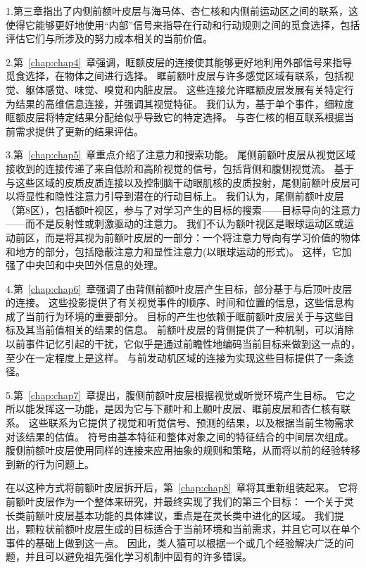 \par 
1.第三章指出了内侧前额叶皮层与海马体、杏仁核和内侧前运动区之间的联系，这使得它能够更好地使用“内部”信号来指导在行动和行动规则之间的觅食选择，包括评估它们与所涉及的努力成本相关的当前价值。
\par 
2.第~\ref{chap:chap4}~章强调，眶额皮层的连接使其能够更好地利用外部信号来指导觅食选择，在物体之间进行选择。
眶前额叶皮层与许多感觉区域有联系，包括视觉、躯体感觉、味觉、嗅觉和内脏皮层。
这些连接允许眶额皮层发展有关特定行为结果的高维信息连接，并强调其视觉特征。
我们认为，基于单个事件，细粒度眶额皮层将特定结果分配给似乎导致它的特定选择。
与杏仁核的相互联系根据当前需求提供了更新的结果评估。
\par 
3.第~\ref{chap:chap5}~章重点介绍了注意力和搜索功能。
尾侧前额叶皮层从视觉区域接收到的连接传递了来自低阶和高阶视觉的信号，包括背侧和腹侧视觉流。
基于与这些区域的皮质皮质连接以及控制脑干动眼肌核的皮质投射，尾侧前额叶皮层可以将显性和隐性注意力引导到潜在的行动目标上。
我们认为，尾侧前额叶皮层（第8区），包括额叶视区，参与了对学习产生的目标的搜索——目标导向的注意力——而不是反射性或刺激驱动的注意力。
我们不认为额叶视区是眼球运动区或运动前区，而是将其视为前额叶皮层的一部分：一个将注意力导向有学习价值的物体和地方的部分，包括隐蔽注意力和显性注意力(以眼球运动的形式)。
这样，它加强了中央凹和中央凹外信息的处理。
\par 
4.第~\ref{chap:chap6}~章强调了由背侧前额叶皮层产生目标，部分基于与后顶叶皮层的连接。
这些投影提供了有关视觉事件的顺序、时间和位置的信息，这些信息构成了当前行为环境的重要部分。
目标的产生也依赖于眶前额叶皮层关于与这些目标及其当前值相关的结果的信息。
前额叶皮层的背侧提供了一种机制，可以消除以前事件记忆引起的干扰，它似乎是通过前瞻性地编码当前目标来做到这一点的，至少在一定程度上是这样。
与前发动机区域的连接为实现这些目标提供了一条途径。
\par 
5.第~\ref{chap:chap7}~章提出，腹侧前额叶皮层根据视觉或听觉环境产生目标。
它之所以能发挥这一功能，是因为它与下颞叶和上颞叶皮层、眶前皮层和杏仁核有联系。
这些联系为它提供了视觉和听觉信号、预测的结果，以及根据当前生物需求对该结果的估值。
符号由基本特征和整体对象之间的特征结合的中间层次组成。
腹侧前额叶皮层使用同样的连接来应用抽象的规则和策略，从而将以前的经验转移到新的行为问题上。
\par 
在以这种方式将前额叶皮层拆开后，第~\ref{chap:chap8}~章将其重新组装起来。
它将前额叶皮层作为一个整体来研究，并最终实现了我们的第三个目标：
一个关于灵长类前额叶皮层基本功能的具体建议，重点是在灵长类中进化的区域。
我们提出，颗粒状前额叶皮层生成的目标适合于当前环境和当前需求，并且它可以在单个事件的基础上做到这一点。
因此，类人猿可以根据一个或几个经验解决广泛的问题，并且可以避免祖先强化学习机制中固有的许多错误。

